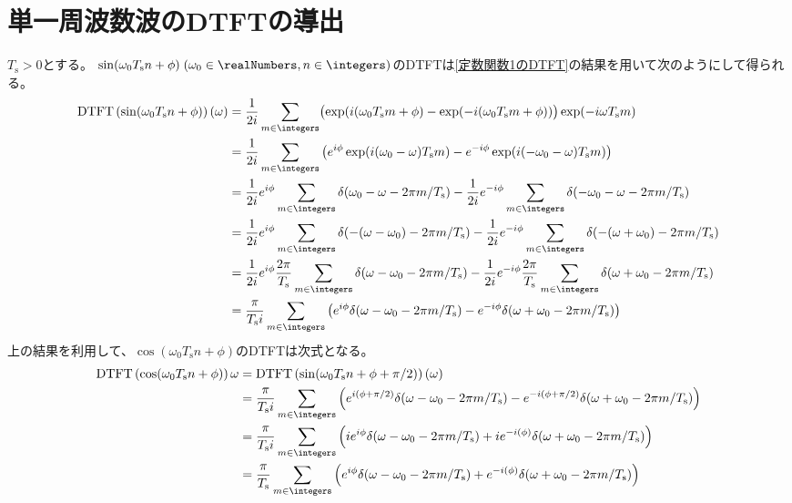 		\section{単一周波数波のDTFTの導出}
			\newcommand{\Ts}{T_\text{s}}
			$T_\text{s}>0$とする。
			$\sin(\omega_0 T_\text{s} n + \phi)\;(\omega_0\in\realNumbers, n\in\integers)$のDTFTは\ref{定数関数1のDTFT}の結果を用いて次のようにして得られる。
			\begin{align*}
				\DTFTwithArg{\sin(\omega_0 T_\text{s} n + \phi)}{\omega} &= \frac{1}{2i}\sum_{m\in\integers} \bigl(\exp(i(\omega_0\Ts m + \phi) - \exp(-i(\omega_0\Ts m + \phi))\bigr)\exp(-i\omega\Ts m) \\
				&= \frac{1}{2i}\sum_{m\in\integers} \left(e^{i\phi}\exp(i(\omega_0-\omega)\Ts m) - e^{-i\phi}\exp(i(-\omega_0-\omega)\Ts m)\right) \\
				&= \frac{1}{2i}e^{i\phi}\sum_{m\in\integers}\delta(\omega_0-\omega - 2\pi m/\Ts) - \frac{1}{2i}e^{-i\phi}\sum_{m\in\integers}\delta(-\omega_0-\omega - 2\pi m/\Ts) \\
				&= \frac{1}{2i}e^{i\phi}\sum_{m\in\integers}\delta(-(\omega-\omega_0) - 2\pi m/\Ts) - \frac{1}{2i}e^{-i\phi}\sum_{m\in\integers}\delta(-(\omega+\omega_0) - 2\pi m/\Ts) \\
				&= \frac{1}{2i}e^{i\phi}\frac{2\pi}{\Ts}\sum_{m\in\integers}\delta(\omega-\omega_0 - 2\pi m/\Ts) - \frac{1}{2i}e^{-i\phi}\frac{2\pi}{\Ts}\sum_{m\in\integers}\delta(\omega+\omega_0 - 2\pi m/\Ts) \\
				&= \frac{\pi}{\Ts i}\sum_{m\in\integers}\left(e^{i\phi}\delta(\omega-\omega_0 - 2\pi m/\Ts) - e^{-i\phi}\delta(\omega+\omega_0 - 2\pi m/\Ts)\right)
			\end{align*}
			上の結果を利用して、$\cos(\omega_0 T_\text{s} n + \phi)$のDTFTは次式となる。
			\begin{align*}
				\DTFT{\cos(\omega_0 T_\text{s} n + \phi)}{\omega} &= \DTFTwithArg{\sin(\omega_0 T_\text{s} n + \phi + \pi/2)}{\omega} \\
				&= \frac{\pi}{\Ts i}\sum_{m\in\integers}\left(e^{i(\phi+\pi/2)}\delta(\omega-\omega_0 - 2\pi m/\Ts) - e^{-i(\phi+\pi/2)}\delta(\omega+\omega_0 - 2\pi m/\Ts)\right) \\
				&= \frac{\pi}{\Ts i}\sum_{m\in\integers}\left(ie^{i\phi}\delta(\omega-\omega_0 - 2\pi m/\Ts) + ie^{-i(\phi)}\delta(\omega+\omega_0 - 2\pi m/\Ts)\right) \\
				&= \frac{\pi}{\Ts}\sum_{m\in\integers}\left(e^{i\phi}\delta(\omega-\omega_0 - 2\pi m/\Ts) + e^{-i(\phi)}\delta(\omega+\omega_0 - 2\pi m/\Ts)\right)
			\end{align*}
			\let\Ts\undefined
